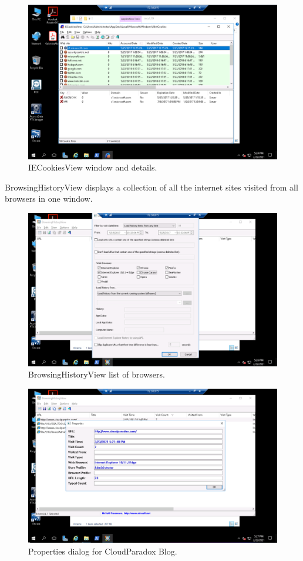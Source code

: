 \begin{figure}[H]
    \centering
    \includegraphics[width=\linewidth]{figures/Part 2 Step 16.png}
    \caption{IECookiesView window and details.}
\end{figure}

BrowsingHistoryView displays a collection of all the internet sites visited from all browsers in one window.
\begin{figure}[H]
    \centering
    \includegraphics[width=\linewidth]{figures/Part 2 Step 20.png}
    \caption{BrowsingHistoryView list of browsers.}
\end{figure}

\begin{figure}[H]
    \centering
    \includegraphics[width=\linewidth]{figures/Part 2 Step 22.png}
    \caption{Properties dialog for CloudParadox Blog.}
\end{figure}

